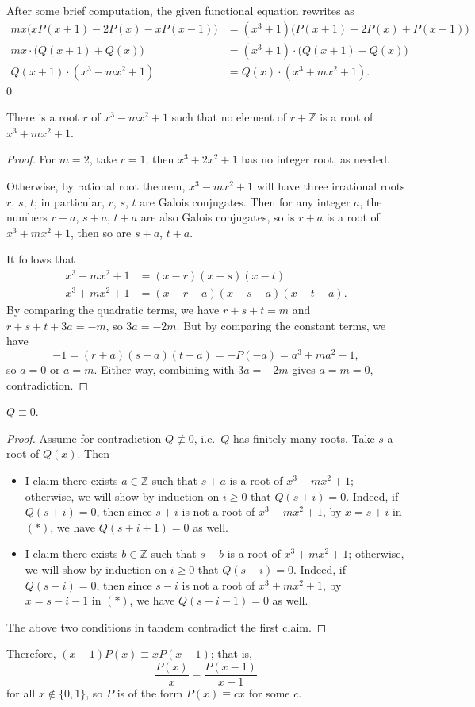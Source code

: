 After some brief computation, the given functional equation rewrites as
\begin{align*}
    mx\big(xP(x+1)-2P(x)-xP(x-1)\big)&=\left(x^3+1\right)\big(P(x+1)-2P(x)+P(x-1)\big)\\
    mx\cdot\big(Q(x+1)+Q(x)\big)&=\left(x^3+1\right)\cdot\big(Q(x+1)-Q(x)\big)\\
    Q(x+1)\cdot\left(x^3-mx^2+1\right)&=Q(x)\cdot\left(x^3+mx^2+1\right).\tag{$*$}
\end{align*}
\setcounter{claim}0
\begin{claim}
    There is a root $r$ of $x^3-mx^2+1$ such that no element of $r+\mathbb Z$ is a root of $x^3+mx^2+1$.
\end{claim}
\begin{proof}
    For $m=2$, take $r=1$; then $x^3+2x^2+1$ has no integer root, as needed.

    Otherwise, by rational root theorem, $x^3-mx^2+1$ will have three irrational roots $r$, $s$, $t$; in particular, $r$, $s$, $t$ are Galois conjugates. Then for any integer $a$, the numbers $r+a$, $s+a$, $t+a$ are also Galois conjugates, so is $r+a$ is a root of $x^3+mx^2+1$, then so are $s+a$, $t+a$.

    It follows that
    \begin{align*}
        x^3-mx^2+1&=(x-r)(x-s)(x-t)\\
        x^3+mx^2+1&=(x-r-a)(x-s-a)(x-t-a).
    \end{align*}
    By comparing the quadratic terms, we have $r+s+t=m$ and $r+s+t+3a=-m$, so $3a=-2m$. But by comparing the constant terms, we have
    \[-1=(r+a)(s+a)(t+a)=-P(-a)=a^3+ma^2-1,\]
    so $a=0$ or $a=m$. Either way, combining with $3a=-2m$ gives $a=m=0$, contradiction.
\end{proof}
\begin{claim}
    $Q\equiv0$.
\end{claim}
\begin{proof}
    Assume for contradiction $Q\not\equiv0$, i.e.\ $Q$ has finitely many roots. Take $s$ a root of $Q(x)$. Then
    \begin{itemize}
        \item I claim there exists $a\in\mathbb Z$ such that $s+a$ is a root of $x^3-mx^2+1$; otherwise, we will show by induction on $i\ge0$ that $Q(s+i)=0$. Indeed, if $Q(s+i)=0$, then since $s+i$ is not a root of $x^3-mx^2+1$, by $x=s+i$ in $(*)$, we have $Q(s+i+1)=0$ as well.
        \item I claim there exists $b\in\mathbb Z$ such that $s-b$ is a root of $x^3+mx^2+1$; otherwise, we will show by induction on $i\ge0$ that $Q(s-i)=0$. Indeed, if $Q(s-i)=0$, then since $s-i$ is not a root of $x^3+mx^2+1$, by $x=s-i-1$ in $(*)$, we have $Q(s-i-1)=0$ as well.
    \end{itemize}
    The above two conditions in tandem contradict the first claim.
\end{proof}

Therefore, $(x-1)P(x)\equiv xP(x-1)$; that is,
\[\frac{P(x)}x=\frac{P(x-1)}{x-1}\]
for all $x\notin\{0,1\}$, so $P$ is of the form $P(x)\equiv cx$ for some $c$.
